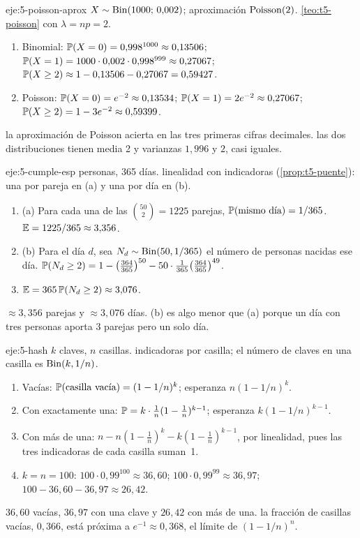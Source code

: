 \begin{solucion}{eje:5-poisson-aprox}
\datos $X\sim\operatorname{Bin}(1000;\,0{,}002)$; aproximación $\operatorname{Poisson}(2)$.
\planteamiento \cref{teo:t5-poisson} con $\lambda=np=2$.
\pasos
\begin{enumerate}[label=\arabic*.]
  \item Binomial: $\mathbb{P}(X=0)=0{,}998^{1000}\approx0{,}13506$; $\mathbb{P}(X=1)=1000\cdot0{,}002\cdot0{,}998^{999}\approx0{,}27067$; $\mathbb{P}(X\ge2)\approx1-0{,}13506-0{,}27067=0{,}59427$.
  \item Poisson: $\mathbb{P}(X=0)=e^{-2}\approx0{,}13534$; $\mathbb{P}(X=1)=2e^{-2}\approx0{,}27067$; $\mathbb{P}(X\ge2)=1-3e^{-2}\approx0{,}59399$.
\end{enumerate}
\resultado la aproximación de Poisson acierta en las tres primeras cifras decimales.
\comprobacion las dos distribuciones tienen media 2 y varianzas $1{,}996$ y $2$, casi iguales.
\end{solucion}

\begin{solucion}{eje:5-cumple-esp}
 personas, 365 días.
\planteamiento linealidad con indicadoras (\cref{prop:t5-puente}): una por pareja en (a) y una por día en (b).
\pasos
\begin{enumerate}[label=\arabic*.]
  \item (a) Para cada una de las $\binom{50}2=1225$ parejas, $\mathbb{P}(\text{mismo día})=1/365$. $\mathbb{E}=1225/365\approx3{,}356$.
  \item (b) Para el día $d$, sea $N_d\sim\operatorname{Bin}(50,1/365)$ el número de personas nacidas ese día. $\mathbb{P}(N_d\ge2)=1-\bigl(\tfrac{364}{365}\bigr)^{50}-50\cdot\tfrac1{365}\bigl(\tfrac{364}{365}\bigr)^{49}$.
  \item $\mathbb{E}=365\,\mathbb{P}(N_d\ge2)\approx3{,}076$.
\end{enumerate}
\resultado $\approx3{,}356$ parejas y $\approx3{,}076$ días.
\comprobacion (b) es algo menor que (a) porque un día con tres personas aporta 3 parejas pero un solo día.
\end{solucion}

\begin{solucion}{eje:5-hash}
\datos $k$ claves, $n$ casillas.
\planteamiento indicadoras por casilla; el número de claves en una casilla es $\operatorname{Bin}(k,1/n)$.
\pasos
\begin{enumerate}[label=\arabic*.]
  \item Vacías: $\mathbb{P}(\text{casilla vacía})=(1-1/n)^{k}$; esperanza $n(1-1/n)^{k}$.
  \item Con exactamente una: $\mathbb{P}=k\cdot\frac1n(1-\frac1n)^{k-1}$; esperanza $k(1-1/n)^{k-1}$.
  \item Con más de una: $n-n(1-\frac1n)^{k}-k(1-\frac1n)^{k-1}$, por linealidad, pues las tres indicadoras de cada casilla suman~1.
  \item $k=n=100$: $100\cdot0{,}99^{100}\approx36{,}60$; $100\cdot0{,}99^{99}\approx36{,}97$; $100-36{,}60-36{,}97\approx26{,}42$.
\end{enumerate}
\resultado $36{,}60$ vacías, $36{,}97$ con una clave y $26{,}42$ con más de una.
\comprobacion la fracción de casillas vacías, $0{,}366$, está próxima a $e^{-1}\approx0{,}368$, el límite de $(1-1/n)^{n}$.
\end{solucion}

